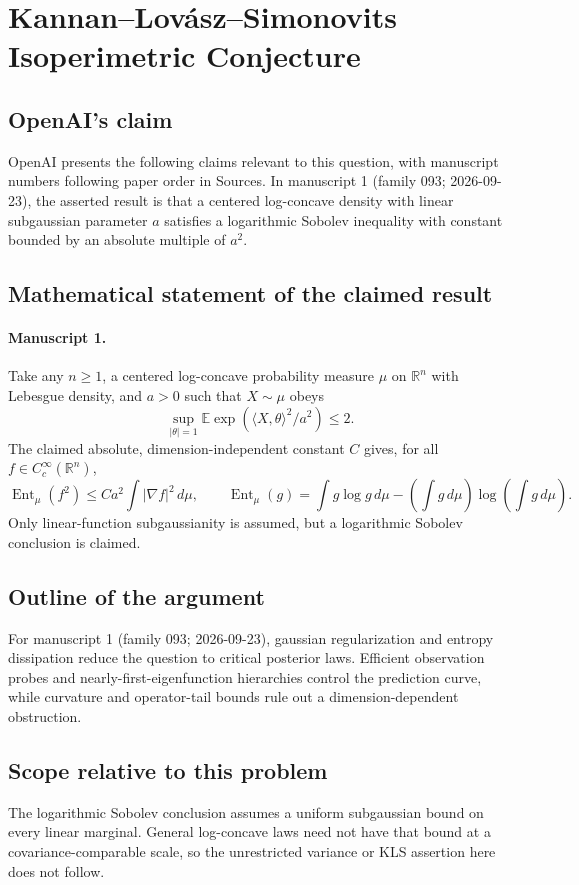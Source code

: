 \documentclass[11pt]{article}
\begin{document}
\section*{Kannan–Lovász–Simonovits Isoperimetric Conjecture}

\subsection{OpenAI's claim}
OpenAI presents the following claims relevant to this question, with manuscript numbers following paper order in Sources. In manuscript 1 (family 093; 2026-09-23), the asserted result is that a centered log-concave density with linear subgaussian parameter $a$ satisfies a logarithmic Sobolev inequality with constant bounded by an absolute multiple of $a^2$.

\subsection{Mathematical statement of the claimed result}
\paragraph{Manuscript 1.}
Take any $n\ge1$, a centered log-concave probability measure $\mu$ on $\mathbb R^n$ with Lebesgue density, and $a>0$ such that $X\sim\mu$ obeys
\[
 \sup_{|\theta|=1}\mathbb E\exp(\langle X,\theta\rangle^2/a^2)\le2.
\]
The claimed absolute, dimension-independent constant $C$ gives, for all $f\in C_c^{\infty}(\mathbb R^n)$,
\[
 \operatorname{Ent}_{\mu}(f^2)\le Ca^2\int|\nabla f|^2\,d\mu,
 \qquad \operatorname{Ent}_{\mu}(g)=\int g\log g\,d\mu-
 (\int g\,d\mu)\log(\int g\,d\mu).
\]
Only linear-function subgaussianity is assumed, but a logarithmic Sobolev conclusion is claimed.

\subsection{Outline of the argument}
For manuscript 1 (family 093; 2026-09-23), gaussian regularization and entropy dissipation reduce the question to critical posterior laws. Efficient observation probes and nearly-first-eigenfunction hierarchies control the prediction curve, while curvature and operator-tail bounds rule out a dimension-dependent obstruction.

\subsection{Scope relative to this problem}
The logarithmic Sobolev conclusion assumes a uniform subgaussian bound on every linear marginal. General log-concave laws need not have that bound at a covariance-comparable scale, so the unrestricted variance or KLS assertion here does not follow.
\end{document}
